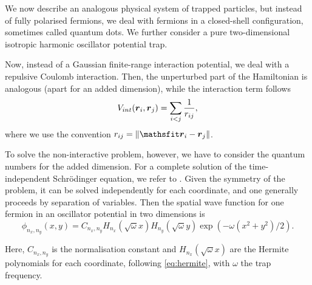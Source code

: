 We now describe an analogous physical system of trapped particles, but instead of fully polarised fermions, we deal with fermions in a closed-shell configuration, sometimes called quantum dots. We further consider a pure two-dimensional isotropic harmonic oscillator potential trap. 

Now, instead of a Gaussian finite-range interaction potential, we deal with a repulsive Coulomb interaction. Then, the unperturbed part of the Hamiltonian is analogous (apart for an added dimension), while the interaction term follows
\begin{equation*}
V_{int}(\boldsymbol{r}_i, \boldsymbol{r}_j)=\sum_{i<j}\frac{1}{r_{ij}},
\end{equation*}
where we use the convention $r_{ij} = \norm{\mvec{r}_i - \mvec{r}_j}$.

To solve the non-interactive problem, however, we have to consider the quantum numbers for the added dimension. For a complete solution of the time-independent Schrödinger equation, we refer to \cite{xia2023quantum}. Given the symmetry of the problem, it can be solved independently for each coordinate, and one generally proceeds by separation of variables. Then the spatial wave function for one fermion in an oscillator potential in two dimensions is
\begin{equation}
\phi_{n_x,n_y}(x,y) = C_{n_x,n_y} H_{n_x}(\sqrt{\omega}x)H_{n_y}(\sqrt{\omega}y)\exp{(-\omega(x^2+y^2)/2)}.
\label{eq:one_fermion_2dHO}
\end{equation}

Here, $C_{n_x,n_y}$ is the normalisation constant and $H_{n_x}(\sqrt{\omega}x)$ are the Hermite polynomials for each coordinate, following \eqref{eq:hermite}, with $\omega$ the trap frequency. 

